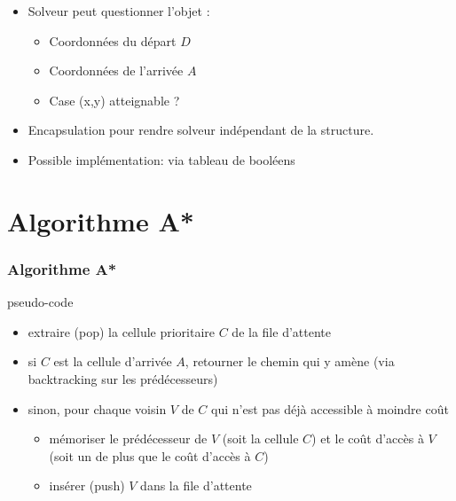 \documentclass[]{beamer}
\begin{document}
\begin{frame}
\begin{minipage}{.65\linewidth}
   \begin{itemize}
   \item<2-> Solveur peut questionner l'objet :
     \begin{itemize}
     \item<3-> Coordonnées du départ $D$
     \item<4-> Coordonnées de l'arrivée $A$
     \item<5-> Case (x,y) atteignable ?
     \end{itemize}
   \item<6-> Encapsulation pour rendre solveur indépendant de la structure.
   \item<6-> Possible implémentation: via tableau de booléens
  \end{itemize}
 \end{minipage}
\end{frame}

\section{Algorithme A*}
\begin{frame}
  \frametitle{Algorithme A*}
  \begin{block}{pseudo-code}
    \medskip
    
    \begin{itemize}
    \item<3-> extraire (pop) la cellule prioritaire $C$ de la file d'attente
    \item<4-> si $C$ est la cellule d'arrivée $A$, retourner le chemin qui y amène (via backtracking sur les prédécesseurs)
    \item<5-> sinon, pour chaque voisin $V$ de $C$ qui n'est pas déjà accessible à moindre coût
      \begin{itemize}
      \item<6-> mémoriser le prédécesseur de $V$ (soit la cellule $C$) et le
        coût d'accès à $V$ (soit un de plus que le coût d'accès à $C$)
      \item<6-> insérer (push) $V$ dans la file d'attente
      \end{itemize}
    \end{itemize}    
  \end{block}
\end{frame}
\end{document}
